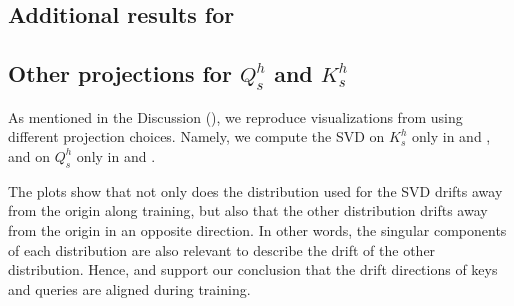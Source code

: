 
\renewcommand{\thesection}{\Alph{section}}

\begin{appendices}
\section{Additional results for }
\subsection{Other projections for $Q^h_s$ and $K^h_s$}
\label{sec:other_projs}

As mentioned in the Discussion (), we reproduce visualizations from  using different projection choices. Namely, we compute the SVD on $K^h_s$ only in  and , and on $Q^h_s$ only in  and .

The plots show that not only does the distribution used for the SVD drifts away from the origin along training, but also that the other distribution drifts away from the origin in an opposite direction. In other words, the singular components of each distribution are also relevant to describe the drift of the other distribution. Hence,  and  support our conclusion that the drift directions of keys and queries are aligned during training.



\end{appendices}
